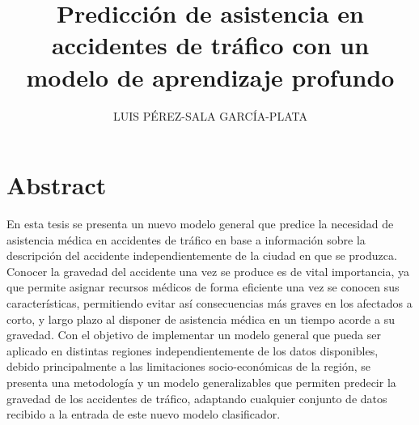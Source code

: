 \documentclass{uathesis-es}
\title{Predicción de asistencia en accidentes de tráfico con un modelo de aprendizaje profundo}
\author{LUIS PÉREZ-SALA GARCÍA-PLATA}
\begin{document}
	
	\maketitle
	
	\listoffigures
	\listoftables
	
	\tableofcontents
	
	
	
	\chapter*{Abstract}
	
	
	
	
	
	En esta tesis se presenta un nuevo modelo general que predice la necesidad de asistencia médica en accidentes de tráfico en base a información sobre la descripción del accidente independientemente de la ciudad en que se produzca. Conocer la gravedad del accidente una vez se produce es de vital importancia, ya que permite asignar recursos médicos de forma eficiente una vez se conocen sus características, permitiendo evitar así consecuencias más graves en los afectados a corto, y largo plazo al disponer de asistencia médica en un tiempo acorde a su gravedad. Con el objetivo de implementar un modelo general que pueda ser aplicado en distintas regiones independientemente de los datos disponibles, debido principalmente a las limitaciones socio-económicas de la región, se presenta una metodología y un modelo generalizables que permiten predecir la gravedad de los accidentes de tráfico, adaptando cualquier conjunto de datos recibido a la entrada de este nuevo modelo clasificador.
	
\end{document}
